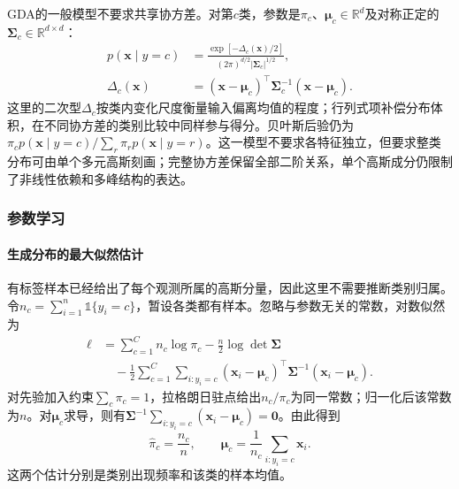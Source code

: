 GDA的一般模型不要求共享协方差。对第$c$类，参数是$\pi_c$、$\bm{\mu}_c\in\mathbb{R}^{d}$及对称正定的$\bm{\Sigma}_c\in\mathbb{R}^{d\times d}$：
\begin{equation}
  \label{eq:classification-gda-density}
  \begin{aligned}
    p(\bm{x}\mid y=c)
      &=\frac{\exp[-\Delta_c(\bm{x})/2]}
        {(2\pi)^{d/2}|\bm{\Sigma}_c|^{1/2}},\\
    \Delta_c(\bm{x})
      &=(\bm{x}-\bm{\mu}_c)^{\top}
        \bm{\Sigma}_c^{-1}(\bm{x}-\bm{\mu}_c).
  \end{aligned}
\end{equation}
这里的二次型$\Delta_c$按类内变化尺度衡量输入偏离均值的程度；行列式项补偿分布体积，在不同协方差的类别比较中同样参与得分。贝叶斯后验仍为$\pi_cp(\bm{x}\mid y=c)/\sum_r\pi_rp(\bm{x}\mid y=r)$。这一模型不要求各特征独立，但要求整类分布可由单个多元高斯刻画；完整协方差保留全部二阶关系，单个高斯成分仍限制了非线性依赖和多峰结构的表达。

\subsubsection{参数学习}
\label{sec:classification-lda-learning}

\paragraph{生成分布的最大似然估计}
有标签样本已经给出了每个观测所属的高斯分量，因此这里不需要推断类别归属。令$n_c=\sum_{i=1}^{n}\mathbb{1}\{y_i=c\}$，暂设各类都有样本。忽略与参数无关的常数，对数似然为
\begin{equation}
  \label{eq:classification-lda-likelihood}
  \begin{aligned}
    \ell
      &=\sum_{c=1}^{C}n_c\log\pi_c
        -\frac n2\log\det\bm{\Sigma}\\
      &\quad-\frac12\sum_{c=1}^{C}\sum_{i:y_i=c}
        (\bm{x}_i-\bm{\mu}_c)^{\top}
        \bm{\Sigma}^{-1}(\bm{x}_i-\bm{\mu}_c).
  \end{aligned}
\end{equation}
对先验加入约束$\sum_c\pi_c=1$，拉格朗日驻点给出$n_c/\pi_c$为同一常数；归一化后该常数为$n$。对$\bm{\mu}_c$求导，则有$\bm{\Sigma}^{-1}\sum_{i:y_i=c}(\bm{x}_i-\bm{\mu}_c)=\bm{0}$。由此得到
\begin{equation}
  \label{eq:classification-lda-mean-prior}
  \hat\pi_c=\frac{n_c}{n},\qquad
  \hat{\bm{\mu}}_c=\frac1{n_c}\sum_{i:y_i=c}\bm{x}_i .
\end{equation}
这两个估计分别是类别出现频率和该类的样本均值。

